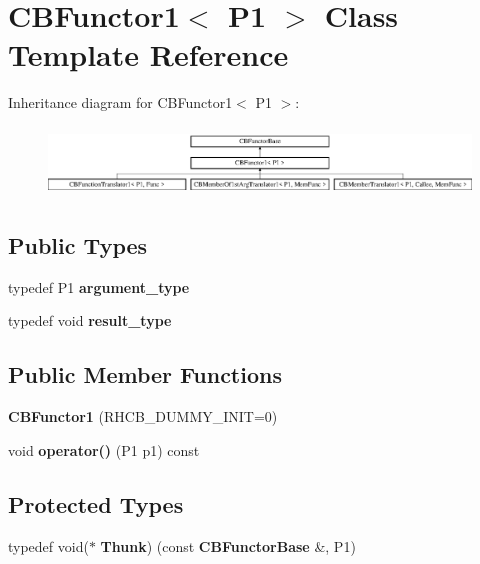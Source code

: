 \section{C\+B\+Functor1$<$ P1 $>$ Class Template Reference}
\label{classCBFunctor1}
Inheritance diagram for C\+B\+Functor1$<$ P1 $>$\+:\begin{figure}[H]
\begin{center}
\leavevmode
\includegraphics[height=1.854305cm]{classCBFunctor1}
\end{center}
\end{figure}
\subsection*{Public Types}
\begin{DoxyCompactItemize}
\item 
typedef P1 {\bfseries argument\+\_\+type}\label{classCBFunctor1_ad53b976c17b95b8170f3597725821386}

\item 
typedef void {\bfseries result\+\_\+type}\label{classCBFunctor1_a6803f5dfe59d2edeb3988b09b7d73b6e}

\end{DoxyCompactItemize}
\subsection*{Public Member Functions}
\begin{DoxyCompactItemize}
\item 
{\bfseries C\+B\+Functor1} (R\+H\+C\+B\+\_\+\+D\+U\+M\+M\+Y\+\_\+\+I\+N\+IT=0)\label{classCBFunctor1_a732275eb7e272ade6a20cf4d973ac7e0}

\item 
void {\bfseries operator()} (P1 p1) const \label{classCBFunctor1_a0d9c9376cf5017cc26c96e7cb66adda1}

\end{DoxyCompactItemize}
\subsection*{Protected Types}
\begin{DoxyCompactItemize}
\item 
typedef void($\ast$ {\bfseries Thunk}) (const {\bf C\+B\+Functor\+Base} \&, P1)\label{classCBFunctor1_a5c35fac68dfbf3be1b9af6d23504d6f9}

\end{DoxyCompactItemize}
